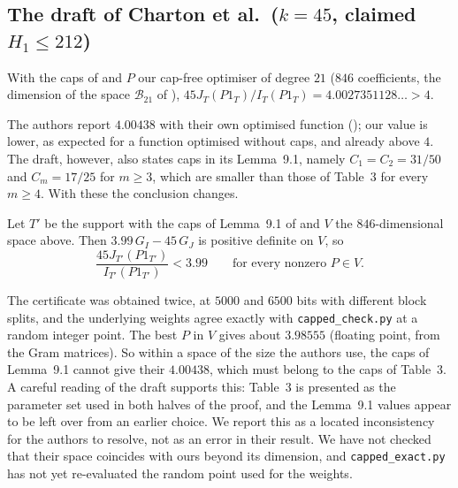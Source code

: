 \subsection*{The draft of Charton et al.\ ($k=45$, claimed $H_1\le212$)}

\begin{proposition}\label{prop:212}
With the caps of \cite[Table~3]{Cha26} and $P$ our cap-free optimiser of
degree $21$ ($846$ coefficients, the dimension of the space
$\mathcal B_{21}$ of \cite[Thm.~11.1]{Cha26}),
$45J_T(P1_T)/I_T(P1_T)=4.0027351128\ldots>4$.
\end{proposition}

The authors report $4.00438$ with their own optimised function ();
our value is lower, as expected for a function optimised without caps, and
already above $4$. The draft, however, also states caps in its Lemma~9.1,
namely $C_1=C_2=31/50$ and $C_m=17/25$ for $m\ge3$, which are smaller than
those of Table~3 for every $m\ge4$. With these the conclusion changes.

\begin{proposition}\label{prop:ceiling}
Let $T'$ be the support with the caps of Lemma~9.1 of \cite{Cha26} and $V$ the
$846$-dimensional space above. Then $3.99\,G_I-45\,G_J$ is positive definite on
$V$, so
\[
\frac{45J_{T'}(P1_{T'})}{I_{T'}(P1_{T'})}<3.99\qquad\text{for every nonzero }P\in V.
\]
\end{proposition}

The certificate was obtained twice, at $5000$ and $6500$ bits with different
block splits, and the underlying weights agree exactly with
\texttt{capped\_check.py} at a random integer point. The best $P$ in $V$ gives
about $3.98555$ (floating point, from the Gram matrices). So within a space of
the size the authors use, the caps of Lemma~9.1 cannot give their
$4.00438$, which must belong to the caps of Table~3. A careful reading of the
draft supports this: Table~3 is presented as the parameter set used in both
halves of the proof, and the Lemma~9.1 values appear to be left over from an
earlier choice. We report this as a located inconsistency for the authors to
resolve, not as an error in their result. We have not checked that their space
coincides with ours beyond its dimension, and \texttt{capped\_exact.py} has not
yet re-evaluated the random point used for the weights.


